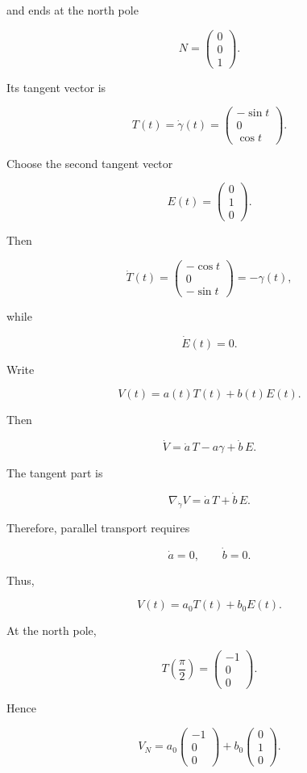 \documentclass[12pt,a4paper]{article}
\theoremstyle{notespace}
\begin{document}
and ends at the north pole

\[
N=
\begin{pmatrix}
	0\\
	0\\
	1
\end{pmatrix}.
\]

Its tangent vector is

\[
T(t)
=
\dot\gamma(t)
=
\begin{pmatrix}
	-\sin t\\
	0\\
	\cos t
\end{pmatrix}.
\]

Choose the second tangent vector

\[
E(t)
=
\begin{pmatrix}
	0\\
	1\\
	0
\end{pmatrix}.
\]

Then

\[
\dot T(t)
=
\begin{pmatrix}
	-\cos t\\
	0\\
	-\sin t
\end{pmatrix}
=
-\gamma(t),
\]

while

\[
\dot E(t)=0.
\]

Write

\[
V(t)=a(t)T(t)+b(t)E(t).
\]

Then

\[
\dot V
=
\dot a\,T-a\gamma+\dot b\,E.
\]

The tangent part is

\[
\nabla_{\dot\gamma}V
=
\dot a\,T+\dot b\,E.
\]

Therefore, parallel transport requires

\[
\dot a=0,
\qquad
\dot b=0.
\]

Thus,

\[
\boxed{
	V(t)=a_0T(t)+b_0E(t).
}
\]

At the north pole,

\[
T\left(\frac{\pi}{2}\right)
=
\begin{pmatrix}
	-1\\
	0\\
	0
\end{pmatrix}.
\]

Hence

\[
\boxed{
	V_N
	=
	a_0
	\begin{pmatrix}
		-1\\
		0\\
		0
	\end{pmatrix}
	+
	b_0
	\begin{pmatrix}
		0\\
		1\\
		0
	\end{pmatrix}.
}
\]
\end{document}
